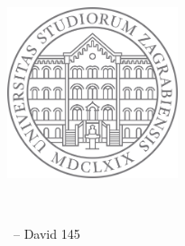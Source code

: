 \begin{titlepage}
    \begin{addmargin}[-1cm]{-3cm}
        \begin{center}
            \large

            \hfill

            \vfill

            \begingroup
            \color{CTtitle}\spacedallcaps{\myTitle} \\ \bigskip
            \endgroup

            \spacedlowsmallcaps{\myName}

            \vfill

            \includegraphics[width=5cm]{gfx/UniZg.png} \\ \medskip

            \mySubtitle \\ \medskip

            \myTime\ -- David 145

            \vfill

        \end{center}
    \end{addmargin}
\end{titlepage}
